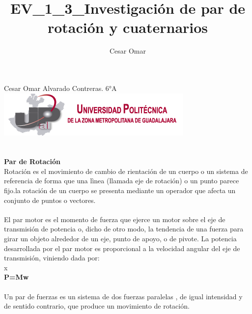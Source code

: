 \documentclass[12pt,a4paper]{report}
\author{Cesar Omar}
\title{EV_1_3_Investigación de par de rotación y cuaternarios}
\begin{document}
Cesar Omar Alvarado Contreras. 6°A
\hspace{3cm}\includegraphics[scale=.5]{Imagenes/imagen1.png} \\
\\
\\

\textbf{Par de Rotación} \\
Rotación es el movimiento de cambio de rientación de un cuerpo o un sistema de referencia de forma que una lìnea (llamada eje de rotación) o un punto parece fijo.la rotación de un cuerpo se presenta mediante un operador que afecta un conjunto de puntos o vectores.\\
\\
El par motor es el momento de fuerza que ejerce un motor sobre el eje de transmisión de potencia o, dicho de otro modo, la tendencia de una fuerza para girar un objeto alrededor de un eje, punto de apoyo, o de pivote. La potencia desarrollada por el par motor es proporcional a la velocidad angular del eje de transmisión, viniendo dada por:\\x
\\ 
\textbf{P=Mw}\\
\\

Un par de fuerzas es un sistema de dos fuerzas paralelas , de igual intensidad y de sentido contrario, que produce un movimiento de rotación.
\end{document}
